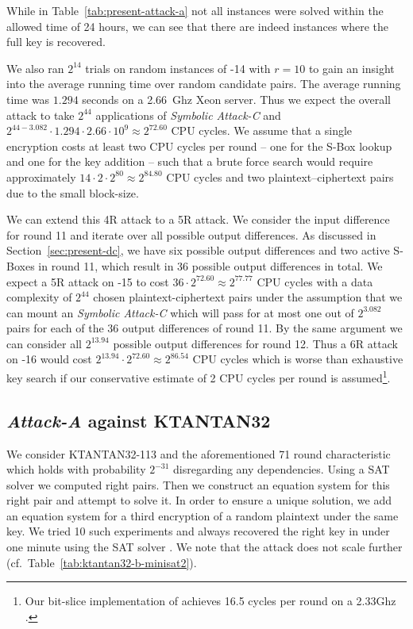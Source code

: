 While in Table~\ref{tab:present-attack-a} not all instances were solved within the allowed time of 24 hours, we can see that there are indeed instances where the full key is recovered.

We also ran $2^{14}$ trials on random instances of -14 with $r=10$ to gain an insight into the average running time over random candidate pairs. The average running time was $1.294$ seconds on a 2.66~Ghz Xeon server. Thus we expect the overall attack to take $2^{44}$ applications of \emph{Symbolic Attack-C} and $2^{44 -3.082} \cdot 1.294 \cdot 2.66 \cdot 10^9 \approx 2^{72.60}$ CPU cycles. We assume that a single encryption costs at least two CPU cycles per round -- one for the S-Box lookup and one for the key addition -- such that a brute force search would require approximately $14 \cdot 2 \cdot 2^{80} \approx 2^{84.80}$ CPU cycles and two plaintext--ciphertext pairs due to the small block-size.

We can extend this 4R attack to a 5R attack. We consider the input difference for round 11 and iterate over all possible output differences. As discussed in Section~\ref{sec:present-dc}, we have six possible output differences and two active S-Boxes in round 11, which result in 36 possible output differences in total. We expect a 5R attack on -15 to cost $36 \cdot 2^{72.60} \approx 2^{77.77}$ CPU cycles with a data complexity of $2^{44}$ chosen plaintext-ciphertext pairs under the assumption that we can mount an \emph{Symbolic Attack-C} which will pass for at most one out of $2^{3.082}$ pairs for each of the 36 output differences of round 11. By the same argument we can consider all $2^{13.94}$ possible output differences for round 12. Thus a 6R attack on -16 would cost $2^{13.94} \cdot 2^{72.60} \approx 2^{86.54}$ CPU cycles which is worse than exhaustive key search if our conservative estimate of 2 CPU cycles per round is assumed\footnote{Our bit-slice implementation of \PRESENT achieves 16.5 cycles per round on a 2.33Ghz \CTD.}.

\subsection{\emph{Attack-A} against KTANTAN32}
We consider KTANTAN32-113 and the aforementioned 71 round characteristic which holds with probability $2^{-31}$ disregarding any dependencies. Using a SAT solver we computed right pairs. Then we construct an equation system for this right pair and attempt to solve it. In order to ensure a unique solution, we add an equation system for a third encryption of a random plaintext under the same key. We tried 10 such experiments and always recovered the right key in under one minute using the SAT solver \CryptoMiniSat. We note that the attack does not scale further (cf.\  Table~\ref{tab:ktantan32-b-minisat2}).


